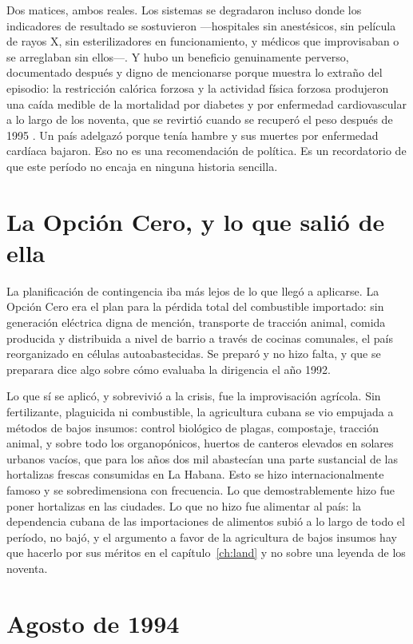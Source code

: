 Dos matices, ambos reales. Los sistemas se degradaron incluso donde los
indicadores de resultado se sostuvieron ---hospitales sin anestésicos, sin
película de rayos X, sin esterilizadores en funcionamiento, y médicos que
improvisaban o se arreglaban sin ellos---. Y hubo un beneficio genuinamente
perverso, documentado después y digno de mencionarse porque muestra lo extraño del
episodio: la restricción calórica forzosa y la actividad física forzosa
produjeron una caída medible de la mortalidad por diabetes y por enfermedad
cardiovascular a lo largo de los noventa, que se revirtió cuando se recuperó el
peso después de 1995 \citep{franco2013}.\unv{} Un país adelgazó porque tenía
hambre y sus muertes por enfermedad cardíaca bajaron. Eso no es una recomendación
de política. Es un recordatorio de que este período no encaja en ninguna historia
sencilla.

\section{La Opción Cero, y lo que salió de ella}

La planificación de contingencia iba más lejos de lo que llegó a aplicarse. La
Opción Cero era el plan para la pérdida total del combustible importado: sin
generación eléctrica digna de mención, transporte de tracción animal, comida
producida y distribuida a nivel de barrio a través de cocinas comunales, el país
reorganizado en células autoabastecidas. Se preparó y no hizo falta, y que se
preparara dice algo sobre cómo evaluaba la dirigencia el año 1992.

Lo que sí se aplicó, y sobrevivió a la crisis, fue la improvisación agrícola. Sin
fertilizante, plaguicida ni combustible, la agricultura cubana se vio empujada a
métodos de bajos insumos: control biológico de plagas, compostaje, tracción
animal, y sobre todo los organopónicos, huertos de canteros elevados en solares
urbanos vacíos, que para los años dos mil abastecían una parte sustancial de las
hortalizas frescas consumidas en La Habana. Esto se hizo internacionalmente
famoso y se sobredimensiona con frecuencia. Lo que demostrablemente hizo fue poner
hortalizas en las ciudades. Lo que no hizo fue alimentar al país: la dependencia
cubana de las importaciones de alimentos subió a lo largo de todo el período, no
bajó, y el argumento a favor de la agricultura de bajos insumos hay que hacerlo
por sus méritos en el capítulo~\ref{ch:land} y no sobre una leyenda de los
noventa.

\section{Agosto de 1994}

